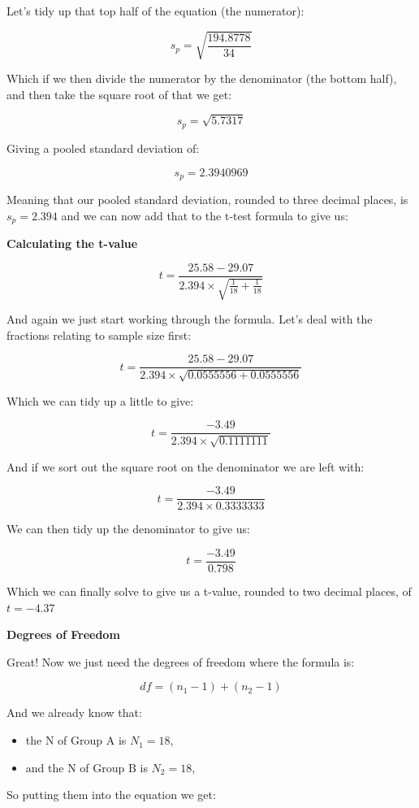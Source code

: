\documentclass[
  oneside]{book}
\providecommand{\tightlist}{%
  \setlength{\itemsep}{0pt}\setlength{\parskip}{0pt}}
\begin{document}
Let's tidy up that top half of the equation (the numerator):

\[s_p = \sqrt{\frac{194.8778}{34}}\]

Which if we then divide the numerator by the denominator (the bottom half), and then take the square root of that we get:

\[s_p = \sqrt{5.7317}\]

Giving a pooled standard deviation of:

\[s_p = 2.3940969\]

Meaning that our pooled standard deviation, rounded to three decimal places, is \(s_p = 2.394\) and we can now add that to the t-test formula to give us:

\textbf{Calculating the t-value}

\[t = \frac{25.58 - 29.07}{2.394 \times \sqrt{\frac{1}{18} + \frac{1}{18}}}\]

And again we just start working through the formula. Let's deal with the fractions relating to sample size first:

\[t = \frac{25.58 - 29.07}{2.394 \times \sqrt{0.0555556 + 0.0555556}}\]

Which we can tidy up a little to give:

\[t = \frac{-3.49}{2.394 \times \sqrt{0.1111111}}\]

And if we sort out the square root on the denominator we are left with:

\[t = \frac{-3.49}{2.394 \times 0.3333333}\]

We can then tidy up the denominator to give us:

\[t = \frac{-3.49}{0.798}\]

Which we can finally solve to give us a t-value, rounded to two decimal places, of \(t = -4.37\)

\textbf{Degrees of Freedom}

Great! Now we just need the degrees of freedom where the formula is:

\[df = (n_1 - 1) + (n_2 - 1)\]

And we already know that:

\begin{itemize}
\tightlist
\item
  the N of Group A is \(N_1 = 18\),
\item
  and the N of Group B is \(N_2 = 18\),
\end{itemize}

So putting them into the equation we get:
\end{document}
